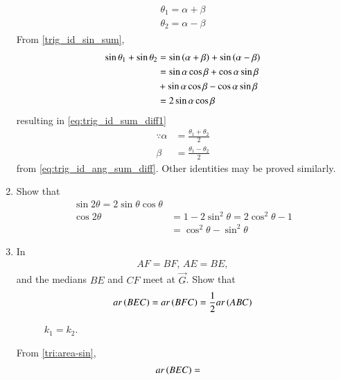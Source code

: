 \begin{enumerate}[label=\thesection.\arabic*.,ref=\thesection.\theenumi]
\begin{align}
\label{eq:trig_id_ang_sum_diff}
\begin{split}
\theta_1 = \alpha + \beta
\\
\theta_2 = \alpha - \beta
\end{split}
\end{align}
%
From \eqref{trig_id_sin_sum},
%
\begin{align}
\sin \theta_1 + \sin \theta_2  &= \sin \left(\alpha + \beta\right) + \sin \left(\alpha - \beta\right)
\\
&= \sin \alpha \cos \beta + \cos \alpha \sin \beta 
\\
&+\sin \alpha \cos \beta - \cos \alpha \sin \beta
\\
&= 2 \sin \alpha \cos \beta
\end{align}
%
resulting in \eqref{eq:trig_id_sum_diff1}
%
\begin{align}
\because \alpha &= \frac{\theta_1 +\theta_2}{2}
\\
\beta &= \frac{\theta_1 -\theta_2}{2}
\end{align}
from \eqref{eq:trig_id_ang_sum_diff}.  Other identities may be proved similarly.
%
\item Show that 
  \begin{align}
\label{eq:trig-id-2A-sin}
	  \sin 2 \theta = 2 \sin \theta \cos \theta
	  \\
	  \cos 2 \theta &= 1 - 2 \sin^2 \theta 
	  =  2 \cos^2 \theta -1
	  \\
	  &= \cos^2 \theta -\sin^2 \theta 
\label{eq:trig-id-2A-cos}
  \end{align}
  \item In 
	\begin{align}
	AF = BF, \,
	AE = BE, 
	\end{align}
	and the medians $BE$ and $CF$ meet at $\vec{G}$.
	Show that
\begin{align}
	ar\left(BEC\right)
	=ar\left(BFC\right) = \frac{1}{2}ar\left(ABC\right)
	\label{eq:median-area}
\end{align}
\begin{figure}[!ht]
	\begin{center}
		\resizebox{0.6\columnwidth}{!}{}
	\end{center}
	\caption{$k_1=k_2$.}
	\label{fig:tri_med_isect}	
\end{figure}
\solution
	From \eqref{tri:area-sin},
\begin{align}
	ar\brak{BEC} &= 

\end{align}
\end{enumerate}

